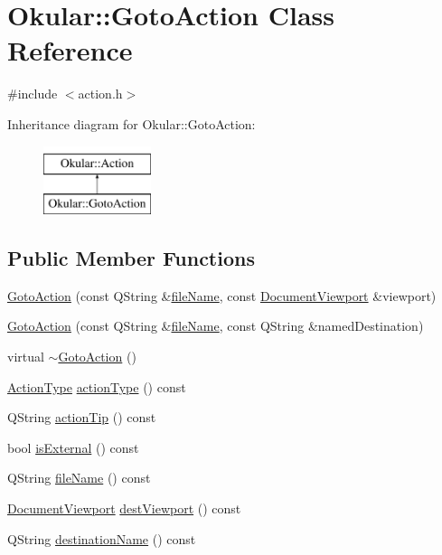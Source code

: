 \hypertarget{classOkular_1_1GotoAction}{\section{Okular\+:\+:Goto\+Action Class Reference}
\label{classOkular_1_1GotoAction}
}


{\ttfamily \#include $<$action.\+h$>$}

Inheritance diagram for Okular\+:\+:Goto\+Action\+:\begin{figure}[H]
\begin{center}
\leavevmode
\includegraphics[height=2.000000cm]{classOkular_1_1GotoAction}
\end{center}
\end{figure}
\subsection*{Public Member Functions}
\begin{DoxyCompactItemize}
\item 
\hyperlink{classOkular_1_1GotoAction_a65baec5f3c64a4b526650776e6fa6421}{Goto\+Action} (const Q\+String \&\hyperlink{classOkular_1_1GotoAction_a310a286fa9e6e3cae3417d7d537274b1}{file\+Name}, const \hyperlink{classOkular_1_1DocumentViewport}{Document\+Viewport} \&viewport)
\item 
\hyperlink{classOkular_1_1GotoAction_ac4c31003ac8061fc2555e5c25412be1a}{Goto\+Action} (const Q\+String \&\hyperlink{classOkular_1_1GotoAction_a310a286fa9e6e3cae3417d7d537274b1}{file\+Name}, const Q\+String \&named\+Destination)
\item 
virtual \hyperlink{classOkular_1_1GotoAction_ad670c3d223d550c579820d30cc6c08b0}{$\sim$\+Goto\+Action} ()
\item 
\hyperlink{classOkular_1_1Action_abe474735af30ea76105595533df9ec47}{Action\+Type} \hyperlink{classOkular_1_1GotoAction_a5ae91d07286ee731939b4392e787443f}{action\+Type} () const 
\item 
Q\+String \hyperlink{classOkular_1_1GotoAction_aea68a11af6da8cb45c59a139f5bc3c15}{action\+Tip} () const 
\item 
bool \hyperlink{classOkular_1_1GotoAction_ace11529e3cc9ddb1f1706dd906b23f45}{is\+External} () const 
\item 
Q\+String \hyperlink{classOkular_1_1GotoAction_a310a286fa9e6e3cae3417d7d537274b1}{file\+Name} () const 
\item 
\hyperlink{classOkular_1_1DocumentViewport}{Document\+Viewport} \hyperlink{classOkular_1_1GotoAction_a98c99e66d65f81da1b25004ae6c13236}{dest\+Viewport} () const 
\item 
Q\+String \hyperlink{classOkular_1_1GotoAction_a261f49a00494e690f18dc5a0d89ee6e1}{destination\+Name} () const 
\end{DoxyCompactItemize}
